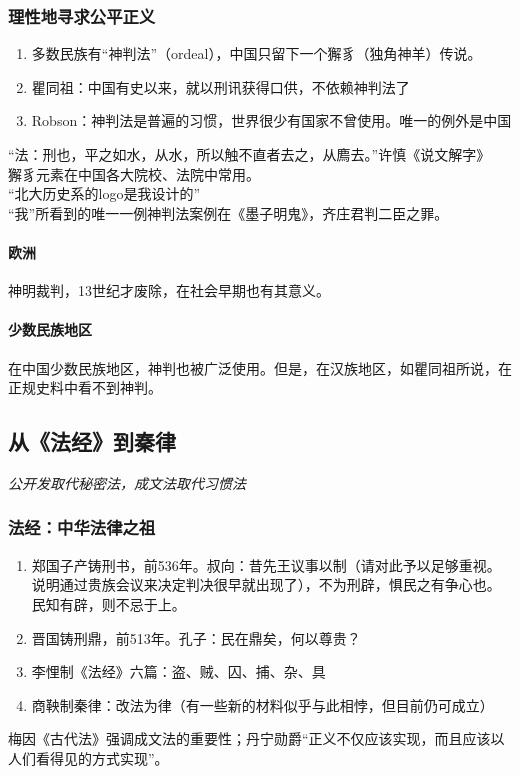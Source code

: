 \documentclass[twoside]{article}
\begin{document}
\subsubsection{理性地寻求公平正义}
\begin{enumerate}
	\item 多数民族有``神判法''（ordeal），中国只留下一个獬豸（独角神羊）传说。
	\item 瞿同祖：中国有史以来，就以刑讯获得口供，不依赖神判法了
	\item Robson：神判法是普遍的习惯，世界很少有国家不曾使用。唯一的例外是中国
\end{enumerate}
``法：刑也，平之如水，从水，所以触不直者去之，从廌去。''许慎《说文解字》\\
獬豸元素在中国各大院校、法院中常用。\\
``北大历史系的logo是我设计的''\\
``我''所看到的唯一一例神判法案例在《墨子明鬼》，齐庄君判二臣之罪。\\
\paragraph*{欧洲}神明裁判，13世纪才废除，在社会早期也有其意义。\\
\paragraph*{少数民族地区}在中国少数民族地区，神判也被广泛使用。但是，在汉族地区，如瞿同祖所说，在正规史料中看不到神判。
\subsection{从《法经》到秦律}
\textit{公开发取代秘密法，成文法取代习惯法}
\subsubsection{法经：中华法律之祖}
\begin{enumerate}
	\item 郑国子产铸刑书，前536年。叔向：昔先王议事以制（请对此予以足够重视。说明通过贵族会议来决定判决很早就出现了），不为刑辟，惧民之有争心也。民知有辟，则不忌于上。
	\item 晋国铸刑鼎，前513年。孔子：民在鼎矣，何以尊贵？
	\item 李悝制《法经》六篇：盗、贼、囚、捕、杂、具
	\item 商鞅制秦律：改法为律（有一些新的材料似乎与此相悖，但目前仍可成立）
\end{enumerate}
梅因《古代法》强调成文法的重要性；丹宁勋爵``正义不仅应该实现，而且应该以人们看得见的方式实现''。
\end{document}
